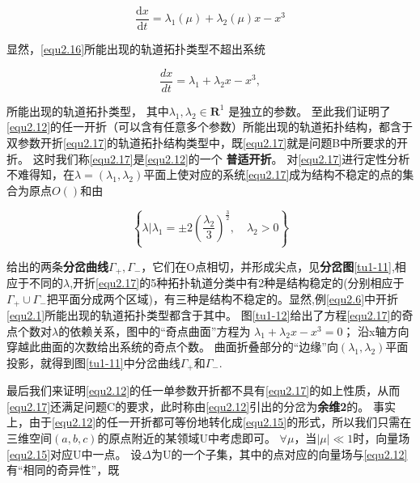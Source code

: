     \begin{equation}
      \frac { \mathrm { d } x } { \mathrm { d } t } = \lambda _ { 1 } ( \mu ) + \lambda _ { 2} ( \mu ) x - x ^ { 3 }
      \label{equ2.16}
    \end{equation}
    
    显然，\ref{equ2.16}所能出现的轨道拓扑类型不超出系统
    
    \begin{equation}
      \frac { d x } { d t } = \lambda _ { 1 } + \lambda _ { 2 } x - x ^ { 3 },
      \label{equ2.17}
    \end{equation}
    
    所能出现的轨道拓扑类型，
    其中$\lambda _ { 1 } , \lambda _ { \mathrm { 2 } } \in \mathbf { R } ^ { 1 }$
    是独立的参数。
    至此我们证明了\ref{equ2.12}的任一开折（可以含有任意多个参数）所能出现的轨道拓扑结构，都含于双参数开折\ref{equ2.17}的轨道拓扑结构类型中，既\ref{equ2.17}就是问题B中所要求的开折。
    这时我们称\ref{equ2.17}是\ref{equ2.12}的一个
    \textbf{普适开折}。
    对\ref{equ2.17}进行定性分析不难得知，在\(\lambda=(\lambda_1,\lambda_2)\)平面上使对应的系统\ref{equ2.17}成为结构不稳定的点的集合为原点\(O()\)和由
    
    \[
\left\{ \lambda | \lambda _ { 1 } = \pm 2 \left( \frac { \lambda _ { 2 } } { 3 } \right) ^ { \frac { 3 } { 2 } } , \quad \lambda _ { 2 } > 0\right \}
    \]

    给出的两条\textbf{分岔曲线}$\Gamma _ { + } , \Gamma _ { - }$，它们在O点相切，并形成尖点，见\textbf{分岔图}\ref{tu1-11},相应于不同的\(\lambda\),开折\ref{equ2.17}的5种拓扑轨道分类中有2种是结构稳定的(分别相应于
    \(\Gamma_+\cup \Gamma_-\)把平面分成两个区域)，有三种是结构不稳定的。显然,例\ref{equ2.6}中开折\ref{equ2.1}所能出现的轨道拓扑类型都含于其中。
    图\ref{tu1-12}给出了方程\ref{equ2.17}的奇点个数对\(\lambda\)的依赖关系，图中的“奇点曲面”方程为
    $\lambda _ { 1 } + \lambda _ { 2 } x - x ^ { 3 } = 0$；
    沿x轴方向穿越此曲面的次数给出系统的奇点个数。
    曲面折叠部分的“边缘”向\((\lambda_1,\lambda_2)\)平面投影，就得到图\ref{tu1-11}中分岔曲线\(\Gamma_+\)和\(\Gamma_-\).


    最后我们来证明\ref{equ2.12}的任一单参数开折都不具有\ref{equ2.17}的如上性质，从而\ref{equ2.17}还满足问题C的要求，此时称由\ref{equ2.12}引出的分岔为\textbf{余维2}的。
    事实上，由于\ref{equ2.12}的任一开折都可等份地转化成\ref{equ2.15}的形式，所以我们只需在三维空间\((a,b,c)\)的原点附近的某领域U中考虑即可。
    $\forall \mu$，当$| \mu | \ll 1$时，向量场\ref{equ2.15}对应U中一点。
    设$\Delta$为U的一个子集，其中的点对应的向量场与\ref{equ2.12}有“相同的奇异性”，既
    
